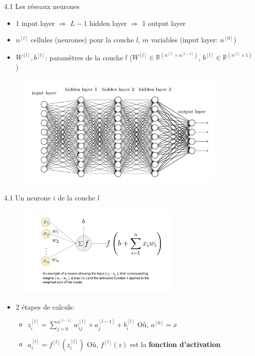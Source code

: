 \begin{frame}{4.1 Les réseaux neurones}
  \begin{itemize}
  \item 1 input layer $\Rightarrow$  $L-1$ hidden layer $\Rightarrow$ 1 output layer
  \item $n^{[l]}$ cellules (neurones) pour la couche $l$, $m$ variables (input layer: $n^{[0]}$)
  \item $W^{[l]}, b^{[l]}$: paramètres de la couche $l$ ($W^{[l]} \in \mathbb{R}^{(n^{[l]} \times n^{[l-1]})}$, $b^{[l]} \in \mathbb{R}^{(n^{[l]} \times 1)}$)
  \end{itemize}
  \vspace{-0.5cm}
  \begin{figure}
    \includegraphics[width=0.9\textwidth]{fig/deepNN.png}
  \end{figure}
\end{frame}

\begin{frame}{4.1 Un neurone $i$ de la couche $l$}
  \begin{figure}
    \includegraphics[trim={2cm 6cm 2cm 1.8cm},clip,width=0.7\textwidth]{fig/neuronEx.jpg}
  \end{figure}
  \begin{itemize}
  \item 2 étapes de calculs: 
    \begin{itemize}
      \normalsize
    \item $z_{i}^{[l]} = \displaystyle\sum_{j=0}^{n^{[l-1]}} w_{ij}^{[l]} \times a_{j}^{[l-1]} + b_{i}^{[l]}$ \hspace{2cm} Où, $a^{[0]} = x$
    \item $a_{i}^{[l]} = f^{[l]}(z_{i}^{[l]})$ \hfill Où, $f^{[l]}(z)$ est la \textbf{fonction d'activation}
    \end{itemize}
  \end{itemize}
\end{frame}

